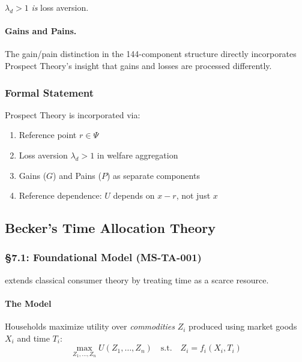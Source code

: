 $\lambda_d > 1$ \emph{is} loss aversion.

\paragraph{Gains and Pains.}
The gain/pain distinction in the 144-component structure directly incorporates
Prospect Theory's insight that gains and losses are processed differently.

\subsubsection{Formal Statement}

\begin{proposition}
Prospect Theory is incorporated via:
\begin{enumerate}
  \item Reference point $r \in \Psi$
  \item Loss aversion $\lambda_d > 1$ in welfare aggregation
  \item Gains ($G$) and Pains ($P$) as separate components
  \item Reference dependence: $U$ depends on $x - r$, not just $x$
\end{enumerate}
\end{proposition}


\subsection{Becker's Time Allocation Theory}
\label{sec:der-time-allocation}

\subsubsection{§7.1: Foundational Model (MS-TA-001)}

\citet{becker1965theory} extends classical consumer theory by treating time as a scarce resource.

\paragraph{The Model}
Households maximize utility over \emph{commodities} $Z_i$ produced using market goods $X_i$ and time $T_i$:
\begin{equation}
\max_{Z_1, \ldots, Z_n} U(Z_1, \ldots, Z_n) \quad \text{s.t.} \quad Z_i = f_i(X_i, T_i)
\end{equation}


